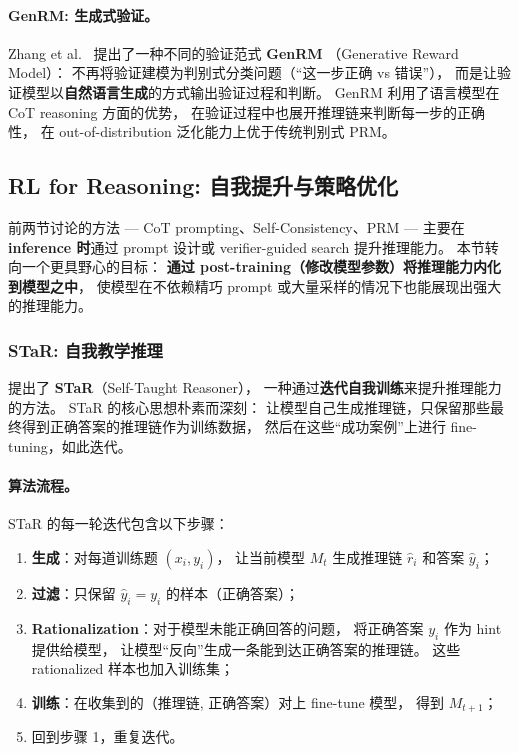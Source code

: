 \paragraph{GenRM: 生成式验证。}
Zhang et al.\ \cite{zhang2024genrm} 提出了一种不同的验证范式 \textbf{GenRM}
（Generative Reward Model）：
不再将验证建模为判别式分类问题（``这一步正确 vs 错误''），
而是让验证模型以\textbf{自然语言生成}的方式输出验证过程和判断。
GenRM 利用了语言模型在 CoT reasoning 方面的优势，
在验证过程中也展开推理链来判断每一步的正确性，
在 out-of-distribution 泛化能力上优于传统判别式 PRM。



\subsection{RL for Reasoning: 自我提升与策略优化}
\label{sec:t4-rl}

前两节讨论的方法 --- CoT prompting、Self-Consistency、PRM ---
主要在 \textbf{inference 时}通过 prompt 设计或 verifier-guided search 提升推理能力。
本节转向一个更具野心的目标：
\textbf{通过 post-training（修改模型参数）将推理能力内化到模型之中}，
使模型在不依赖精巧 prompt 或大量采样的情况下也能展现出强大的推理能力。

\subsubsection{STaR: 自我教学推理}
\label{sec:t4-star}

 提出了 \textbf{STaR}（Self-Taught Reasoner），
一种通过\textbf{迭代自我训练}来提升推理能力的方法。
STaR 的核心思想朴素而深刻：
让模型自己生成推理链，只保留那些最终得到正确答案的推理链作为训练数据，
然后在这些``成功案例''上进行 fine-tuning，如此迭代。

\paragraph{算法流程。}
STaR 的每一轮迭代包含以下步骤：
\begin{enumerate}[leftmargin=2em]
  \item \textbf{生成}：对每道训练题 $(x_i, y_i)$，
    让当前模型 $M_t$ 生成推理链 $\hat{r}_i$ 和答案 $\hat{y}_i$；
  \item \textbf{过滤}：只保留 $\hat{y}_i = y_i$ 的样本（正确答案）；
  \item \textbf{Rationalization}：对于模型未能正确回答的问题，
    将正确答案 $y_i$ 作为 hint 提供给模型，
    让模型``反向''生成一条能到达正确答案的推理链。
    这些 rationalized 样本也加入训练集；
  \item \textbf{训练}：在收集到的（推理链, 正确答案）对上 fine-tune 模型，
    得到 $M_{t+1}$；
  \item 回到步骤 1，重复迭代。
\end{enumerate}

